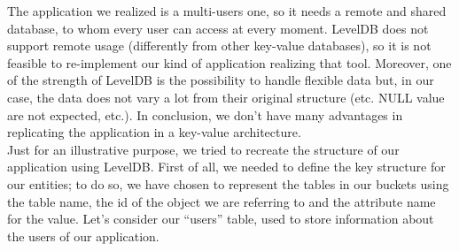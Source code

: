 \documentclass[a4paper, oneside]{article}
\begin{document}
The application we realized is a multi-users one, so it needs a remote and shared database, to whom every user can access at every moment. LevelDB does not support remote usage (differently from other key-value databases), so it is not feasible to re-implement our kind of application realizing that tool. Moreover, one of the strength of LevelDB is the possibility to handle flexible data but, in our case, the data does not vary a lot from their original structure (etc. NULL value are not expected, etc.). In conclusion, we don’t have many advantages in replicating the application in a key-value architecture.\\
Just for an illustrative purpose, we tried to recreate the structure of our application using LevelDB.
First of all, we needed to define the key structure for our entities; to do so, we have chosen to represent the tables in our buckets using the table name, the id of the object we are referring to and the attribute name for the value.
Let’s consider our “users” table, used to store information about the users of our application.\\
\end{document}
